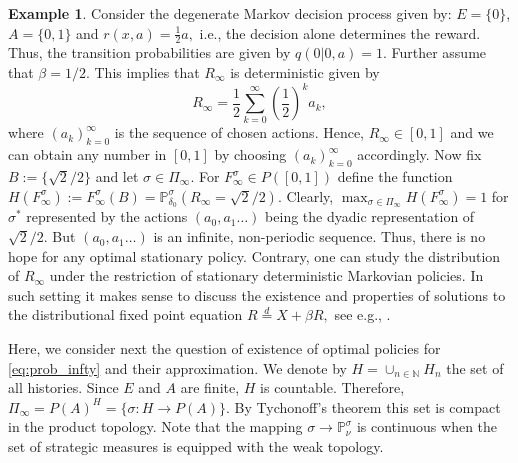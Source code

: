 \documentclass[reqno, 12pt]{amsart}%
\newcommand{\N}{\mathbb{N}} %
\newcommand{\PP}{\mathbb{P}}
\newtheorem{proposition}[theorem]{Proposition}
\theoremstyle{definition}
\newtheorem{example}[theorem]{Example}
\numberwithin{equation}{section} \numberwithin{theorem}{section}
\begin{document}
\begin{example}\label{exam2}
Consider the  degenerate Markov 
decision process given by: $E=\{0\}$, 
$A=\{0,1\}$ and $r(x,a)=\frac12 a,$ i.e., the decision alone determines the reward. 
Thus, the transition probabilities are given by $q(0|0,a)=1.$ Further assume that 
$\beta=1/2.$ This implies that $R_\infty$ is deterministic given by
$$ R_\infty = \frac12 \sum_{k=0}^\infty \left(\frac12\right)^k a_k,$$
where $(a_k)_{k=0}^\infty$ is the sequence of chosen 
actions. Hence, $R_\infty \in [0,1]$ and we 
can obtain any number in $[0,1]$ by 
choosing $(a_k)_{k=0}^\infty$ accordingly. Now fix  $B:=\{\sqrt{2}/2\}$ and let
$\sigma\in\Pi_\infty.$ 
For $F^\sigma_\infty\in P([0,1])$ define  the function $H(F^\sigma_\infty) := 
F^\sigma_\infty(B) =\PP^\sigma_{\delta_0}(R_\infty = \sqrt{2}/2).$ 
Clearly, $ \max_{\sigma\in\Pi_\infty} H(F^\sigma_\infty)=1$ for $\sigma^*$  
represented by the actions $(a_0,a_1\ldots )$ being the dyadic representation 
of $\sqrt{2}/2$. 
But $(a_0,a_1\ldots )$ is an infinite,  
non-periodic sequence. Thus, there is no hope 
for any optimal stationary  policy. Contrary, 
one can study the distribution of $R_\infty$ 
under the restriction of stationary 
deterministic Markovian policies. In such 
setting it makes sense to discuss the 
existence and properties of solutions to the 
distributional fixed point equation $R 
\stackrel{d}{=} X + \beta R,$ see e.g., 
\cite{neininger}. 
\end{example}

Here, we consider next the question of 
existence of optimal policies for 
\eqref{eq:prob_infty} and their approximation. 
We denote by $H=\cup_{n\in \N} H_n$ the set of all 
histories. Since $E$ and $A$ are finite, $H$ is 
countable. Therefore, $\Pi_\infty =P(A)^H=\{\sigma: 
H\to P(A)\}.$ By Tychonoff's theorem this set is 
compact in the product topology.  Note that
the mapping $\sigma\to \PP^\sigma_\nu$ is continuous when the set of strategic measures is equipped with the weak topology.


\end{document}
